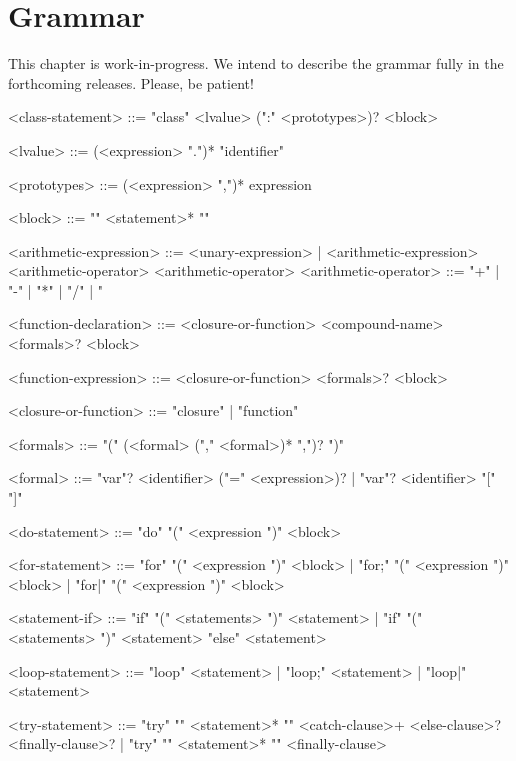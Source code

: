 
\chapter{Grammar}
\label{sec:grammar}

This chapter is work-in-progress.  We intend to describe the grammar fully
in the forthcoming releases.  Please, be patient!

\begin{bnf}
<class-statement>
  ::= "class" <lvalue> (":" <prototypes>)? <block>

<lvalue>
  ::= (<expression> ".")* "identifier"

<prototypes>
  ::= (<expression> ",")* expression

<block>
  ::= "{" <statement>* "}"


<arithmetic-expression>
   ::= <unary-expression>
     | <arithmetic-expression> <arithmetic-operator> <arithmetic-operator>
<arithmetic-operator> ::= "+" | "-" | "*" | "/" | "%


<function-declaration>
  ::= <closure-or-function> <compound-name> <formals>? <block>

<function-expression>
  ::= <closure-or-function> <formals>? <block>

<closure-or-function> ::= "closure" | "function"

<formals> ::= "(" (<formal> ("," <formal>)* ",")? ")"

<formal> ::= "var"? <identifier> ("=" <expression>)?
           | "var"? <identifier> "[" "]"


<do-statement> ::= "do" "(" <expression ")" <block>


<for-statement>
   ::= "for" "(" <expression ")" <block>
     | "for;" "(" <expression ")" <block>
     | "for|" "(" <expression ")" <block>


<statement-if>
  ::= "if" "(" <statements> ")" <statement>
    | "if" "(" <statements> ")" <statement> "else" <statement>


<loop-statement>
  ::= "loop" <statement>
    | "loop;" <statement>
    | "loop|" <statement>


<try-statement>
  ::= "try" "{" <statement>* "}" <catch-clause>+ <else-clause>? <finally-clause>?
    | "try" "{" <statement>* "}" <finally-clause>


\end{bnf}

